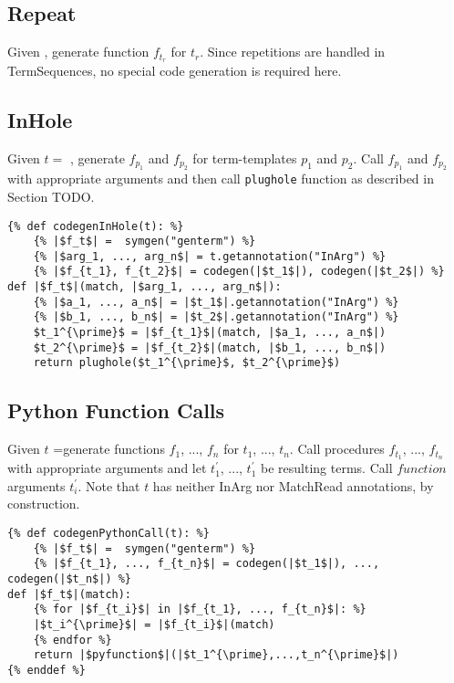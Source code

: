 \subsection{Repeat}
Given \TermRepeat, generate function $f_{t_r}$ for $t_r$. Since repetitions are handled in TermSequences, no special code generation is required here.

\subsection{InHole}
Given $t=$ \TermInHole, generate $f_{p_1}$ and $f_{p_2}$ for term-templates $p_1$ and $p_2$. Call $f_{p_1}$ and $f_{p_2}$ with appropriate arguments and then call \texttt{plughole} function as described in Section TODO. 

\begin{verbatim}
{% def codegenInHole(t): %}
	{% |$f_t$| =  symgen("genterm") %}
	{% |$arg_1, ..., arg_n$| = t.getannotation("InArg") %}
	{% |$f_{t_1}, f_{t_2}$| = codegen(|$t_1$|), codegen(|$t_2$|) %}
def |$f_t$|(match, |$arg_1, ..., arg_n$|):
	{% |$a_1, ..., a_n$| = |$t_1$|.getannotation("InArg") %}
	{% |$b_1, ..., b_n$| = |$t_2$|.getannotation("InArg") %}
	$t_1^{\prime}$ = |$f_{t_1}$|(match, |$a_1, ..., a_n$|)
	$t_2^{\prime}$ = |$f_{t_2}$|(match, |$b_1, ..., b_n$|)
	return plughole($t_1^{\prime}$, $t_2^{\prime}$) 
\end{verbatim}


\subsection{Python Function Calls}
Given $t$ =\PythonCall generate functions $f_1$, ..., $f_n$ for $t_1$, ..., $t_n$. Call procedures $f_{t_1}$, ..., $f_{t_n}$ with appropriate arguments and let $t_1^{\prime}$, ..., $t_1^{\prime}$ be resulting terms. Call $function$ arguments $t_i^{\prime}$. Note that $t$ has neither InArg nor MatchRead annotations, by construction.

\begin{verbatim}
{% def codegenPythonCall(t): %}
	{% |$f_t$| =  symgen("genterm") %}
	{% |$f_{t_1}, ..., f_{t_n}$| = codegen(|$t_1$|), ..., codegen(|$t_n$|) %}
def |$f_t$|(match):
	{% for |$f_{t_i}$| in |$f_{t_1}, ..., f_{t_n}$|: %}
	|$t_i^{\prime}$| = |$f_{t_i}$|(match)
	{% endfor %}
	return |$pyfunction$|(|$t_1^{\prime},...,t_n^{\prime}$|) 
{% enddef %}
\end{verbatim}



